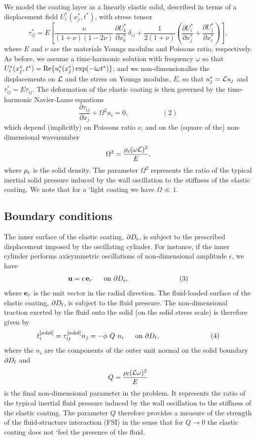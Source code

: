 We model the coating layer as a linearly elastic solid, described in terms of a displacement field $U^*_i(x_j^*,t^*)$, with stress tensor \[ \tau_{ij}^* = E \left[ \frac{\nu}{(1+\nu)(1-2\nu)} \, \frac{\partial U_k^*}{\partial x_k^*} \, \delta_{ij} +\frac{1}{2(1+\nu)}\left( \frac{\partial U_i^*}{\partial x_j^*}+ \frac{\partial U_j^*}{\partial x_i^*} \right) \right], \] where $E$ and $\nu$ are the material\textquotesingle{}s Young\textquotesingle{}s modulus and Poisson\textquotesingle{}s ratio, respectively. As before, we assume a time-\/harmonic solution with frequency $\omega$ so that $U_i^*(x_j^*,t^*) = {\rm Re} \{ u_i^*(x_j^*) \exp(-{\rm i}\omega t^*)\}$, and we non-\/dimensionalise the displacements on ${\cal L}$ and the stress on Young\textquotesingle{}s modulus, $E$, so that $u_j^* = {\cal L} u_j$ and $\tau_{ij}^* = E \tau_{ij}$. The deformation of the elastic coating is then governed by the time-\/harmonic Navier-\/\+Lame equations \[ \frac{\partial \tau_{ij}}{\partial x_j} + \Omega^2 u_i = 0, \ \ \ \ \ \ \ \ \ \ \ \ \ \ \ \ \ \ \ \ \ \ (2) \] which depend (implicitly) on Poisson\textquotesingle{}s ratio $\nu$, and on the (square of the) non-\/dimensional wavenumber \[ \Omega^2 = \frac{\rho_{\rm s} (\omega {\cal L})^2}{E}, \] where $ \rho_{\rm s} $ is the solid density. The parameter $ \Omega^2 $ represents the ratio of the typical inertial solid pressure induced by the wall oscillation to the stiffness of the elastic coating. We note that for a `light\textquotesingle{} coating we have $\Omega \ll 1$.\hypertarget{index_bc}{}\subsection{Boundary conditions}\label{index_bc}
The inner surface of the elastic coating, $ \partial D_{\rm s} $, is subject to the prescribed displacement imposed by the oscillating cylinder. For instance, if the inner cylinder performs axisymmetric oscillations of non-\/dimensional amplitude $ \epsilon$, we have \[ \mbox{\bf u} = \epsilon \, \mbox{\bf e}_r \mbox{\ \ \ \ \ on $\partial D_{\rm s}$}, \ \ \ \ \ \ \ \ \ \ \ \ \ \ \ \ \ \ \ \ \ \ (3) \] where $ \mbox{\bf e}_r $ is the unit vector in the radial direction. The fluid-\/loaded surface of the elastic coating, $ \partial D_{\rm f} $, is subject to the fluid pressure. The non-\/dimensional traction exerted by the fluid onto the solid (on the solid stress scale) is therefore given by \[ t_i^{\rm [solid]} = \tau_{ij}^{\rm [solid]} n_j = - \phi \ Q \ n_i \mbox{\ \ \ \ \ on $\partial D_{\rm f}$}, \ \ \ \ \ \ \ \ \ \ \ \ \ \ \ \ \ \ \ \ \ \ (4) \] where the $n_i$ are the components of the outer unit normal on the solid boundary $\partial D_{\rm f}$ and \[ Q=\frac{\rho_{\rm f}({\cal L}\omega)^2}{E} \] is the final non-\/dimensional parameter in the problem. It represents the ratio of the typical inertial fluid pressure induced by the wall oscillation to the stiffness of the elastic coating. The parameter $Q$ therefore provides a measure of the strength of the fluid-\/structure interaction (F\+SI) in the sense that for $Q \to 0$ the elastic coating does not `feel\textquotesingle{} the presence of the fluid.

